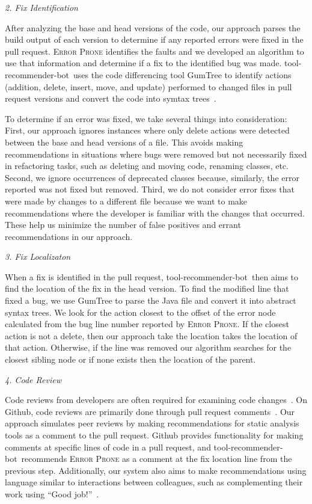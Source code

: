 \documentclass[conference]{IEEEtran}
\newcommand{\tool}{tool-recommender-bot}
\newcommand{\pseudosubsection}[1]{\vspace{2mm} {\it #1}}
\begin{document}
\pseudosubsection{2. Fix Identification}

After analyzing the base and head versions of the code, our approach parses the build output of each version to determine if any reported errors were fixed in the pull request. \textsc{Error Prone} identifies the faults and we developed an algorithm to use that information and determine if a fix to the identified bug was made. \tool~uses the code differencing tool GumTree to identify actions (addition, delete, insert, move, and update) performed to changed files in pull request versions and convert the code into symtax trees~\cite{GumTree}. 

To determine if an error was fixed, we take several things into consideration: First, our approach ignores instances where only delete actions were detected between the base and head versions of a file. This avoids making recommendations in situations where bugs were removed but not necessarily fixed in refactoring tasks, such as deleting and moving code, renaming classes, etc. Second, we ignore occurrences of deprecated classes because, similarly, the error reported was not fixed but removed. Third, we do not consider error fixes that were made by changes to a different file because we want to make recommendations where the developer is familiar with the changes that occurred. These help us minimize the number of false positives and errant recommendations in our approach.

\pseudosubsection{3. Fix Localizaton}

When a fix is identified in the pull request, \tool~then aims to find the location of the fix in the head version. To find the modified line that fixed a bug, we use GumTree to parse the Java file and convert it into abstract syntax trees. We look for the action closest to the offset of the error node calculated from the bug line number reported by \textsc{Error Prone}. If the closest action is not a delete, then our approach take the location takes the location of that action. Otherwise, if the line was removed our algorithm searches for the closest sibling node or if none exists then the location of the parent.

\pseudosubsection{4. Code Review}

Code reviews from developers are often required for examining code changes~\cite{?}. On Github, code reviews are primarily done through pull request comments~\cite{?}. Our approach simulates peer reviews by making recommendations for static analysis tools as a comment to the pull request. Github provides functionality for making comments at specific lines of code in a pull request, and \tool~recommends \textsc{Error Prone} as a comment at the fix location line from the previous step. Additionally, our system also aims to make recommendations using language similar to interactions between colleagues, such as complementing their work using ``Good job!''~\cite{?}.
\end{document}
